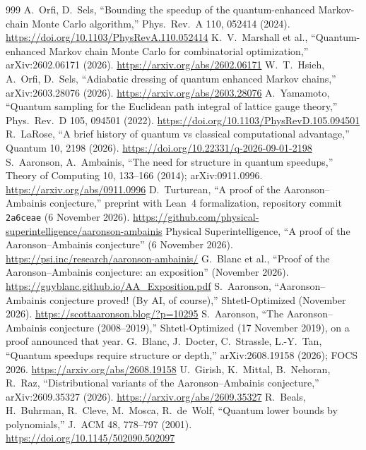 \begin{thebibliography}{999}
 A.~Orfi, D.~Sels, ``Bounding the speedup of the quantum-enhanced Markov-chain Monte Carlo algorithm,'' Phys.\ Rev.\ A 110, 052414 (2024). \url{https://doi.org/10.1103/PhysRevA.110.052414}
 K.~V.~Marshall et al., ``Quantum-enhanced Markov chain Monte Carlo for combinatorial optimization,'' arXiv:2602.06171 (2026). \url{https://arxiv.org/abs/2602.06171}
 W.~T.~Hsieh, A.~Orfi, D.~Sels, ``Adiabatic dressing of quantum enhanced Markov chains,'' arXiv:2603.28076 (2026). \url{https://arxiv.org/abs/2603.28076}
 A.~Yamamoto, ``Quantum sampling for the Euclidean path integral of lattice gauge theory,'' Phys.\ Rev.\ D 105, 094501 (2022). \url{https://doi.org/10.1103/PhysRevD.105.094501}
 R.~LaRose, ``A brief history of quantum vs classical computational advantage,'' Quantum 10, 2198 (2026). \url{https://doi.org/10.22331/q-2026-09-01-2198}
 S.~Aaronson, A.~Ambainis, ``The need for structure in quantum speedups,'' Theory of Computing 10, 133--166 (2014); arXiv:0911.0996. \url{https://arxiv.org/abs/0911.0996}
 D.~Turturean, ``A proof of the Aaronson--Ambainis conjecture,'' preprint with Lean~4 formalization, repository commit \texttt{2a6ceae} (6 November 2026). \url{https://github.com/physical-superintelligence/aaronson-ambainis}
 Physical Superintelligence, ``A proof of the Aaronson--Ambainis conjecture'' (6 November 2026). \url{https://psi.inc/research/aaronson-ambainis/}
 G.~Blanc et al., ``Proof of the Aaronson--Ambainis conjecture: an exposition'' (November 2026). \url{https://guyblanc.github.io/AA_Exposition.pdf}
 S.~Aaronson, ``Aaronson--Ambainis conjecture proved! (By AI, of course),'' Shtetl-Optimized (November 2026). \url{https://scottaaronson.blog/?p=10295}
 S.~Aaronson, ``The Aaronson--Ambainis conjecture (2008--2019),'' Shtetl-Optimized (17 November 2019), on a proof announced that year.
 G.~Blanc, J.~Docter, C.~Strassle, L.-Y.~Tan, ``Quantum speedups require structure or depth,'' arXiv:2608.19158 (2026); FOCS 2026. \url{https://arxiv.org/abs/2608.19158}
 U.~Girish, K.~Mittal, B.~Nehoran, R.~Raz, ``Distributional variants of the Aaronson--Ambainis conjecture,'' arXiv:2609.35327 (2026). \url{https://arxiv.org/abs/2609.35327}
 R.~Beals, H.~Buhrman, R.~Cleve, M.~Mosca, R.~de~Wolf, ``Quantum lower bounds by polynomials,'' J.\ ACM 48, 778--797 (2001). \url{https://doi.org/10.1145/502090.502097}

\end{thebibliography}
